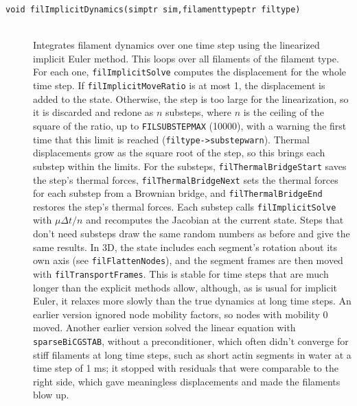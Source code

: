 \documentclass {scrbook}
\newcommand {\ttt} {\texttt}
\begin{document}
\begin{description}
\item[\ttt{void filImplicitDynamics(simptr sim,filamenttypeptr filtype)}]
\hfill \\
Integrates filament dynamics over one time step using the linearized implicit Euler method. This loops over all filaments of the filament type. For each one, \ttt{filImplicitSolve} computes the displacement for the whole time step. If \ttt{filImplicitMoveRatio} is at most 1, the displacement is added to the state. Otherwise, the step is too large for the linearization, so it is discarded and redone as $n$ substeps, where $n$ is the ceiling of the square of the ratio, up to \ttt{FILSUBSTEPMAX} (10000), with a warning the first time that this limit is reached (\ttt{filtype->substepwarn}). Thermal displacements grow as the square root of the step, so this brings each substep within the limits. For the substeps, \ttt{filThermalBridgeStart} saves the step's thermal forces, \ttt{filThermalBridgeNext} sets the thermal forces for each substep from a Brownian bridge, and \ttt{filThermalBridgeEnd} restores the step's thermal forces. Each substep calls \ttt{filImplicitSolve} with $\mu\Delta t/n$ and recomputes the Jacobian at the current state. Steps that don't need substeps draw the same random numbers as before and give the same results. In 3D, the state includes each segment's rotation about its own axis (see \ttt{filFlattenNodes}), and the segment frames are then moved with \ttt{filTransportFrames}. This is stable for time steps that are much longer than the explicit methods allow, although, as is usual for implicit Euler, it relaxes more slowly than the true dynamics at long time steps. An earlier version ignored node mobility factors, so nodes with mobility 0 moved. Another earlier version solved the linear equation with \ttt{sparseBiCGSTAB}, without a preconditioner, which often didn't converge for stiff filaments at long time steps, such as short actin segments in water at a time step of 1 ms; it stopped with residuals that were comparable to the right side, which gave meaningless displacements and made the filaments blow up.


\end{description}
\end{document}
